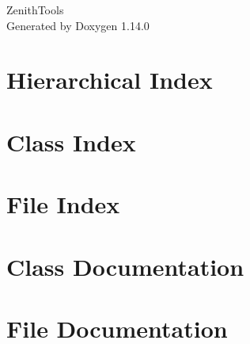 \documentclass[twoside]{book}
\newcommand{\+}{\discretionary{\mbox{\scriptsize$\hookleftarrow$}}{}{}}
\newcommand{\clearemptydoublepage}{%
    \newpage{\pagestyle{empty}\cleardoublepage}%
  }
\begin{document}
  \raggedbottom
    \hypersetup{pageanchor=false,
                bookmarksnumbered=true,
                pdfencoding=unicode
               }
  \begin{titlepage}
  \vspace*{7cm}
  \begin{center}%
  {\Large Zenith\+Tools}\\
  \vspace*{1cm}
  {\large Generated by Doxygen 1.14.0}\\
  \end{center}
  \end{titlepage}
  \clearemptydoublepage
  \tableofcontents
  \clearemptydoublepage
  \hypersetup{pageanchor=true}
\chapter{Hierarchical Index}

\chapter{Class Index}

\chapter{File Index}

\chapter{Class Documentation}












\chapter{File Documentation}















  \backmatter
  \newpage
  \clearemptydoublepage
  \printindex
\end{document}
